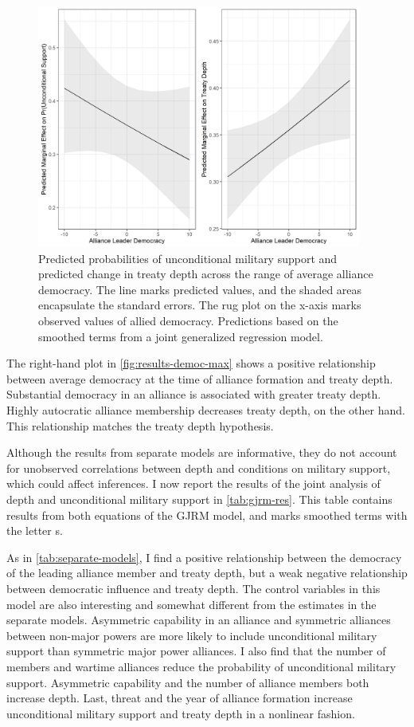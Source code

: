 \documentclass[12pt]{article}
\begin{document}
\begin{figure}[hbtp]
\centering
\includegraphics[width=0.95\textwidth]{../figures/results-democ-max.png}
\caption{Predicted probabilities of unconditional military support and predicted change in treaty depth across the range of average alliance democracy. The line marks predicted values, and the shaded areas encapsulate the standard errors. The rug plot on the x-axis marks observed values of allied democracy. Predictions based on the smoothed terms from a joint generalized regression model.}
\label{fig:results-democ-max}
\end{figure}


The right-hand plot in \autoref{fig:results-democ-max} shows a positive relationship between average democracy at the time of alliance formation and treaty depth.
Substantial democracy in an alliance is associated with greater treaty depth. 
Highly autocratic alliance membership decreases treaty depth, on the other hand. 
This relationship matches the treaty depth hypothesis.


Although the results from separate models are informative, they do not account for unobserved correlations between depth and conditions on military support, which could affect inferences. 
I now report the results of the joint analysis of depth and unconditional military support in \autoref{tab:gjrm-res}. 
This table contains results from both equations of the GJRM model, and marks smoothed terms with the letter s. 


As in \autoref{tab:separate-models}, I find a positive relationship between the democracy of the leading alliance member and treaty depth, but a weak negative relationship between democratic influence and treaty depth. 
The control variables in this model are also interesting and somewhat different from the estimates in the separate models.  
Asymmetric capability in an alliance and symmetric alliances between non-major powers are more likely to include unconditional military support than symmetric major power alliances. 
I also find that the number of members and wartime alliances reduce the probability of unconditional military support. 
Asymmetric capability and the number of alliance members both increase depth. 
Last, threat and the year of alliance formation increase unconditional military support and treaty depth in a nonlinear fashion. 
\end{document}

